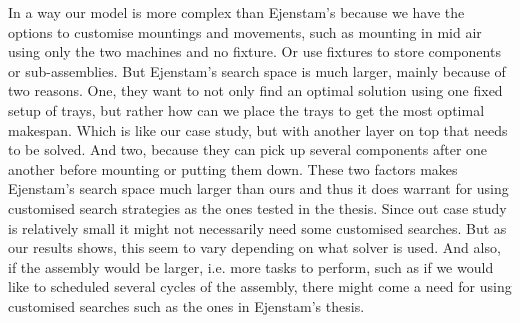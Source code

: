 In a way our model is more complex than Ejenstam's because we have the options to customise mountings and movements, such as mounting in mid air using only the two machines and no fixture. Or use fixtures to store components or sub-assemblies. But Ejenstam's search space is much larger, mainly because of two reasons. One, they want to not only find an optimal solution using one fixed setup of trays, but rather how can we place the trays to get the most optimal makespan. Which is like our case study, but with another layer on top that needs to be solved. And two, because they can pick up several components after one another before mounting or putting them down. These two factors makes Ejenstam's search space much larger than ours and thus it does warrant for using customised search strategies as the ones tested in the thesis. Since out case study is relatively small it might not necessarily need some customised searches. But as our results shows, this seem to vary depending on what solver is used. And also, if the assembly would be larger, i.e. more tasks to perform, such as if we would like to scheduled several cycles of the assembly, there might come a need for using customised searches such as the ones in Ejenstam's thesis.

